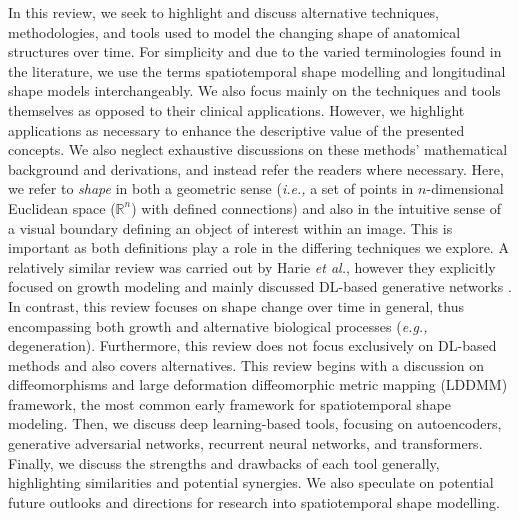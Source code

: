 	In this review, we seek to highlight and discuss alternative techniques, methodologies, and tools used to model the changing shape of anatomical structures over time. For simplicity and due to the varied terminologies found in the literature, we use the terms spatiotemporal shape modelling and longitudinal shape models interchangeably. We also focus mainly on the techniques and tools themselves as opposed to their clinical applications. However, we highlight applications as necessary to enhance the descriptive value of the presented concepts. We also neglect exhaustive discussions on these methods' mathematical background and derivations, and instead refer the readers where necessary. Here, we refer to \textit{shape} in both a geometric sense (\textit{i.e.,} a set of points in $n$-dimensional Euclidean space ($\mathbb{R}^{n}$) with defined connections) and also in the intuitive sense of a visual boundary defining an object of interest within an image. This is important as both definitions play a role in the differing techniques we explore. A relatively similar review was carried out by Harie \textit{et al.}, however they explicitly focused on growth modeling and mainly discussed DL-based generative networks \cite{Harie2023}. In contrast, this review focuses on shape change over time in general, thus encompassing both growth and alternative biological processes (\textit{e.g.,} degeneration). Furthermore, this review does not focus exclusively on DL-based methods and also covers alternatives. This review begins with a discussion on diffeomorphisms and large deformation diffeomorphic metric mapping (LDDMM) framework, the most common early framework for spatiotemporal shape modeling. Then, we discuss deep learning-based tools, focusing on autoencoders, generative adversarial networks, recurrent neural networks, and transformers. Finally, we discuss the strengths and drawbacks of each tool generally, highlighting similarities and potential synergies. We also speculate on potential future outlooks and directions for research into spatiotemporal shape modelling. 
	